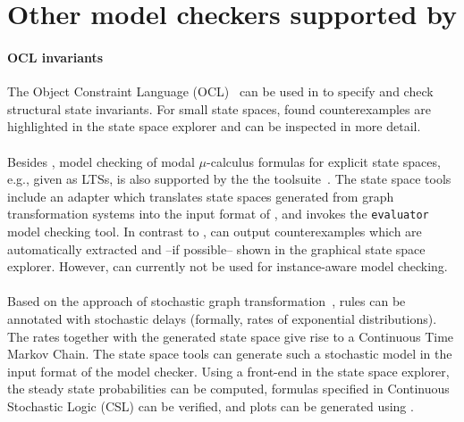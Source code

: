 
\section{Other model checkers supported by \henshin}
\label{sec:modelchecking-other}

\paragraph{OCL invariants}
The Object Constraint Language (OCL)~\cite{ocl} can be used in \henshin to specify and check structural state invariants. For small state spaces, found counterexamples are highlighted in the state space explorer and can be inspected in more detail.
 
\halflineup\paragraph{\cadp}
Besides \mcrl, model checking of modal $\mu$-calculus formulas for explicit state spaces, e.g., given as LTSs, is also supported by the the \cadp toolsuite~\cite{cadp}. The \henshin state space tools include an adapter which translates state spaces generated from graph transformation systems into the input format of \cadp, and invokes the \texttt{evaluator} model checking tool. In contrast to \mcrl, \cadp can output counterexamples which are automatically extracted and --if possible-- shown in the graphical state space explorer. However, \cadp can currently not be used for instance-aware model checking.
 
\halflineup\paragraph{\prism}
Based on the approach of stochastic graph transformation~\cite{HGM06}, \henshin rules can be annotated with stochastic delays (formally, rates of exponential distributions). The rates together with the generated state space give rise to a Continuous Time Markov Chain. The \henshin state space tools can generate such a stochastic model in the input format of the \prism model checker. Using a front-end in the state space explorer, the steady state probabilities can be computed, formulas
specified in Continuous Stochastic Logic (CSL) %
can be verified, and plots can be generated using \prism.

% 

